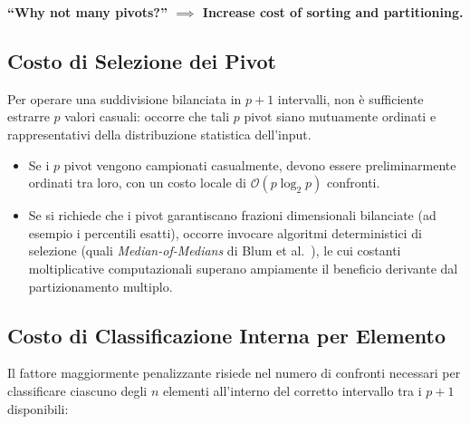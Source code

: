 \begin{center}
  \bfseries ``Why not many pivots?'' $\implies$ Increase cost of sorting and partitioning.
\end{center}
\FloatBarrier

\subsection{Costo di Selezione dei Pivot}
Per operare una suddivisione bilanciata in $p + 1$ intervalli, non è sufficiente estrarre $p$ valori casuali: occorre che tali $p$ pivot siano mutuamente ordinati e rappresentativi della distribuzione statistica dell'input.
\begin{itemize}
  \item Se i $p$ pivot vengono campionati casualmente, devono essere preliminarmente ordinati tra loro, con un costo locale di $\mathcal{O}(p \log_2 p)$ confronti.
  \item Se si richiede che i pivot garantiscano frazioni dimensionali bilanciate (ad esempio i percentili esatti), occorre invocare algoritmi deterministici di selezione (quali \textit{Median-of-Medians} di Blum et al.~\cite{blum1973}), le cui costanti moltiplicative computazionali superano ampiamente il beneficio derivante dal partizionamento multiplo.
\end{itemize}
\FloatBarrier

\subsection{Costo di Classificazione Interna per Elemento}
Il fattore maggiormente penalizzante risiede nel numero di confronti necessari per classificare ciascuno degli $n$ elementi all'interno del corretto intervallo tra i $p + 1$ disponibili:

